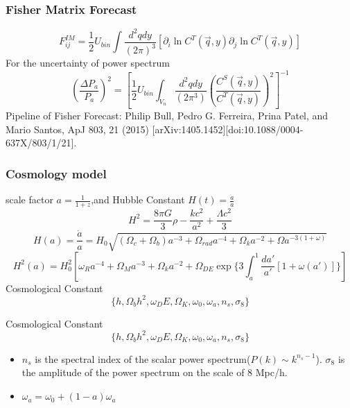 \documentclass[UTF8]{beamer}
\begin{document}
\begin{frame}
    \frametitle{Fisher Matrix Forecast}
    \begin{equation}
        F_{ij}^{IM} = \frac{1}{2}U_{bin}\int\frac{d^2qdy}{(2\pi)^3}[\partial_i \ln C^T(\vec{q},y)\partial_j \ln C^{T}(\vec{q},y)]
    \end{equation}
    For the uncertainty of power spectrum
    \begin{equation}
        (\frac{\Delta P_a}{P_a})^2=[\frac{1}{2}U_{bin}\int_{V_n}\frac{d^2qdy}{(2\pi^3)}(\frac{C^S(\vec{q},y)}{C^T(\vec{q},y)})^2]^{-1}
    \end{equation}
    Pipeline of Fisher Forecast: Philip Bull, Pedro G. Ferreira, Prina Patel, and Mario Santos, ApJ 803, 21 (2015) [arXiv:1405.1452][doi:10.1088/0004-637X/803/1/21].
\end{frame}
    \begin{frame}
        \frametitle{Cosmology model}
        scale factor $a = \frac{1}{1+z}$,and Hubble Constant $H(t)=\frac{\dot{a}}{a}$
        \begin{equation}
            H^2 = \frac{8\pi G}{3}\rho -\frac{kc^2}{a^2}+\frac{\Lambda c^2}{3}
        \end{equation}
        \begin{equation}
            H(a)=\frac{\dot{a}}{a}=H_0\sqrt{(\Omega_c+\Omega_b)a^{-3}+\Omega_{rad}a^{-4}+\Omega_k a^{-2}+\Omega a^{-3(1+\omega)}}
        \end{equation}
        \begin{equation}
            H^2(a)=H_0^2[\omega_R a^{-4}+\Omega_M a^{-3}+\Omega_ka^{-2}+\Omega_{DE}\exp \{3\int_a^1\frac{da'}{a'}[1+\omega(a')] \}]
        \end{equation}
        Cosmological Constant
        \begin{equation}
            \{ h,\Omega_b h^2, \omega_DE, \Omega_K,\omega_0, \omega_a, n_s,\sigma_8 \}
        \end{equation}
    \end{frame}
    \begin{frame}
        Cosmological Constant
        \begin{equation}
            \{ h,\Omega_b h^2, \omega_DE, \Omega_K,\omega_0, \omega_a, n_s,\sigma_8 \}
        \end{equation}
        \begin{itemize}
            \item $n_s$ is the spectral index of the scalar power spectrum($P(k)\sim k^{n_s-1}$). $\sigma_8$ is the amplitude of the power spectrum on the scale of 8 Mpc/h.
            \item $\omega_a = \omega_0+(1-a)\omega_a$
        \end{itemize}
        
        
    \end{frame}
\end{document}
